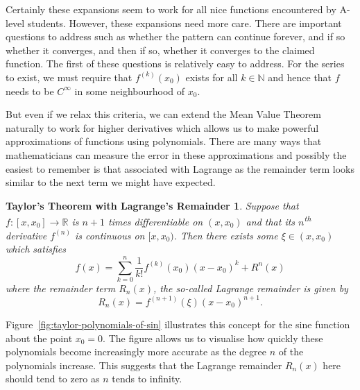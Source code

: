 \documentclass[a4paper,11pt]{article}
\theoremstyle{plain}
\newtheorem*{thmTaylorLagrangeRemainder}{Taylor's Theorem with Lagrange's Remainder}
\begin{document}
Certainly these expansions seem to work for all nice functions encountered by A-level students. However, these expansions need more care. There are important questions to address such as whether the pattern can continue forever, and if so whether it converges, and then if so, whether it converges to the claimed function. The first of these questions is relatively easy to address. For the series to exist, we must require that $f^{(k)}(x_0)$ exists for all $k \in \mathbb{N}$ and hence that $f$ needs to be $C^\infty$ in some neighbourhood of $x_0$.

But even if we relax this criteria, we can extend the Mean Value Theorem naturally to work for higher derivatives which allows us to make powerful approximations of functions using polynomials. There are many ways that mathematicians can measure the error in these approximations and possibly the easiest to remember is that associated with Lagrange as the remainder term looks similar to the next term we might have expected.

\begin{thmTaylorLagrangeRemainder}
Suppose that $f \colon [x, x_0] \to \mathbb{R}$ is $n + 1$ times differentiable on $(x, x_0)$ and that its $n$\textsuperscript{th} derivative $f^{(n)}$ is continuous on $[x, x_0)$. Then there exists some $\xi \in (x, x_0)$ which satisfies \[
f(x) = \sum_{k=0}^n \frac 1{k!} f^{(k)}(x_0) (x - x_0)^k + R^n(x)
\]
where the remainder term $R_n(x)$, the so-called Lagrange remainder is given by \[
R_n(x) = f^{(n+1)}(\xi) (x - x_0)^{n+1}.
\]
\end{thmTaylorLagrangeRemainder}

Figure~\ref{fig:taylor-polynomials-of-sin} illustrates this concept for the sine function about the point $x_0 = 0$. The figure allows us to visualise how quickly these polynomials become increasingly more accurate as the degree $n$ of the polynomials increase. This suggests that the Lagrange remainder $R_n(x)$ here should tend to zero as $n$ tends to infinity.
\end{document}
